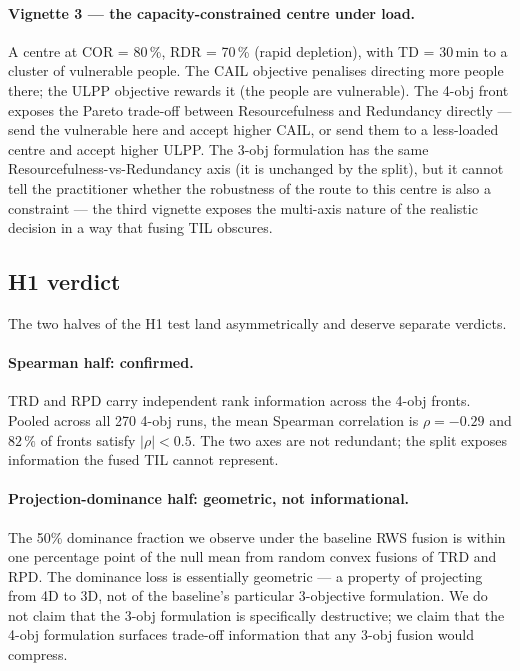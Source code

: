 \documentclass[applsci,article,submit,moreauthors,pdftex]{Definitions/mdpi}
\begin{document}
\paragraph{Vignette 3 --- the capacity-constrained centre under load.}
A centre at COR = 80\,\%, RDR = 70\,\% (rapid depletion), with TD = 30\,min
to a cluster of vulnerable people. The CAIL objective penalises directing
more people there; the ULPP objective rewards it (the people are vulnerable).
The 4-obj front exposes the Pareto trade-off between Resourcefulness and
Redundancy directly --- send the vulnerable here and accept higher CAIL, or
send them to a less-loaded centre and accept higher ULPP. The 3-obj
formulation has the same Resourcefulness-vs-Redundancy axis (it is
unchanged by the split), but it cannot tell the practitioner whether the
robustness of the route to this centre is also a constraint --- the third
vignette exposes the multi-axis nature of the realistic decision in a way
that fusing TIL obscures.

\subsection{H1 verdict}\label{sec:h1-verdict}

The two halves of the H1 test land asymmetrically and deserve separate
verdicts.

\paragraph{Spearman half: confirmed.} TRD and RPD carry independent rank
information across the 4-obj fronts. Pooled across all 270 4-obj runs,
the mean Spearman correlation is $\rho = -0.29$ and $82\,\%$ of fronts
satisfy $|\rho| < 0.5$. The two axes are not redundant; the split exposes
information the fused TIL cannot represent.

\paragraph{Projection-dominance half: geometric, not informational.}
The 50\% dominance fraction we observe under the baseline RWS fusion is
within one percentage point of the null mean from random convex fusions
of TRD and RPD. The dominance loss is essentially geometric --- a
property of projecting from 4D to 3D, not of the baseline's particular
3-objective formulation. We do not claim that the 3-obj formulation is
specifically destructive; we claim that the 4-obj formulation surfaces
trade-off information that any 3-obj fusion would compress.
\end{document}
